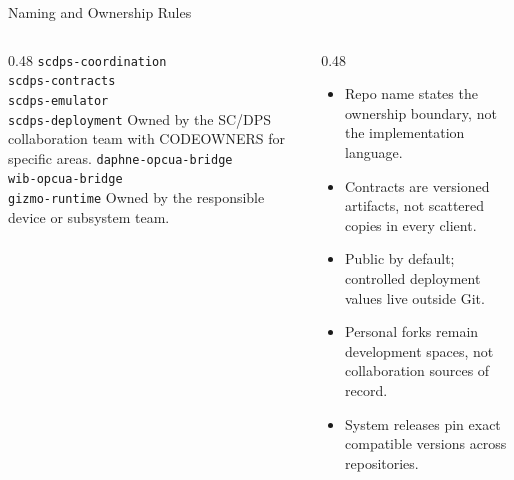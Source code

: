 \documentclass[aspectratio=169,10pt]{beamer}
\begin{document}
\begin{frame}{Naming and Ownership Rules}
\begin{columns}[T,onlytextwidth]
  \begin{column}{0.48\textwidth}
      {\texttt{scdps-coordination}\\\texttt{scdps-contracts}\\\texttt{scdps-emulator}\\\texttt{scdps-deployment}}
      {Owned by the SC/DPS collaboration team with CODEOWNERS for specific areas.}
    \vspace{1.5mm}
      {\texttt{daphne-opcua-bridge}\\\texttt{wib-opcua-bridge}\\\texttt{gizmo-runtime}}
      {Owned by the responsible device or subsystem team.}
  \end{column}
  \begin{column}{0.48\textwidth}
    \begin{itemize}
      \DuneTightList
      \item Repo name states the ownership boundary, not the implementation language.
      \item Contracts are versioned artifacts, not scattered copies in every client.
      \item Public by default; controlled deployment values live outside Git.
      \item Personal forks remain development spaces, not collaboration sources of record.
      \item System releases pin exact compatible versions across repositories.
    \end{itemize}
  \end{column}
\end{columns}
\end{frame}
\end{document}
